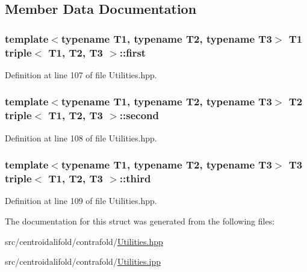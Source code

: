 \subsection{Member Data Documentation}
\hypertarget{structtriple_a6aa8508e6e6f859dda04f144f361c0d2}{
\subsubsection[{first}]{\setlength{\rightskip}{0pt plus 5cm}template$<$typename T1, typename T2, typename T3$>$ T1 {\bf triple}$<$ T1, T2, T3 $>$\+::first}}\label{structtriple_a6aa8508e6e6f859dda04f144f361c0d2}


Definition at line 107 of file Utilities.\+hpp.

\hypertarget{structtriple_a41050194c8c7984707c7ad13c96e8631}{
\subsubsection[{second}]{\setlength{\rightskip}{0pt plus 5cm}template$<$typename T1, typename T2, typename T3$>$ T2 {\bf triple}$<$ T1, T2, T3 $>$\+::second}}\label{structtriple_a41050194c8c7984707c7ad13c96e8631}


Definition at line 108 of file Utilities.\+hpp.

\hypertarget{structtriple_a5675f08ea7996033edbcf7074404cdd8}{
\subsubsection[{third}]{\setlength{\rightskip}{0pt plus 5cm}template$<$typename T1, typename T2, typename T3$>$ T3 {\bf triple}$<$ T1, T2, T3 $>$\+::third}}\label{structtriple_a5675f08ea7996033edbcf7074404cdd8}


Definition at line 109 of file Utilities.\+hpp.



The documentation for this struct was generated from the following files\+:\begin{DoxyCompactItemize}
\item 
src/centroidalifold/contrafold/\hyperlink{centroidalifold_2contrafold_2_utilities_8hpp}{Utilities.\+hpp}\item 
src/centroidalifold/contrafold/\hyperlink{centroidalifold_2contrafold_2_utilities_8ipp}{Utilities.\+ipp}\end{DoxyCompactItemize}
